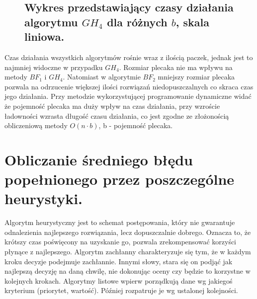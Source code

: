 \documentclass[polish,polish,a4paper]{article}
\begin{document}
\begin{spacing}{1.35}
\begin{figure}[H]
		\subsection*{Wykres przedstawiający czasy działania algorytmu $GH_{4}$ dla różnych $b$, skala liniowa. }
	\end{figure}
	
	Czas działania wszystkich algorytmów rośnie wraz z ilością paczek, jednak jest to najmniej widoczne w przypadku $GH_{4}$. 
	Rozmiar plecaka nie ma wpływu na metody $BF_{1}$ i $GH_{4}$. Natomiast w algorytmie $BF_{2}$ mniejszy rozmiar plecaka pozwala na odrzucenie większej ilości rozwiązań niedopuszczalnych co skraca czas jego działania. Przy metodzie wykorzystującej programowanie dynamiczne widać że pojemność plecaka ma duży wpływ na czas działania, przy wzroście ładowności wzrasta długość czasu działania, co jest zgodne ze złożonością obliczeniową metody $O(n \cdot b)$, b - pojemność plecaka.
	
	\section{Obliczanie średniego błędu popełnionego przez poszczególne heurystyki.}
	Algorytm heurystyczny jest to schemat postępowania, który nie gwarantuje odnalezienia najlepszego rozwiązania, lecz dopuszczalnie dobrego. Oznacza to, że krótszy czas poświęcony na uzyskanie go, pozwala zrekompensować korzyści płynące z najlepszego. Algorytm zachłanny charakteryzuje się tym, że w każdym kroku decyzje podejmuje zachłannie. Innymi słowy, stara się on podjąć jak najlepszą decyzję na daną chwilę, nie dokonując oceny czy będzie to korzystne w kolejnych krokach. Algorytmy listowe wpierw porządkują dane wg jakiegoś kryterium (priorytet, wartość). Później rozpatruje je wg ustalonej kolejności.


\end{spacing}
\end{document}
